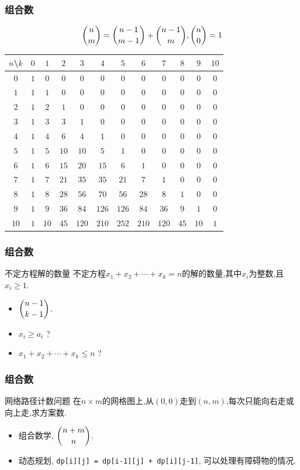\documentclass{beamer}
\newcommand{\pau}{}
\begin{document}
\begin{frame}[fragile]
    \frametitle{组合数}
    $$\dbinom{n}{m}=\dbinom{n-1}{m-1}+\dbinom{n-1}{m},\dbinom{n}{0}=1$$
	\begin{center}
		\footnotesize
		\begin{tabular}{c|ccccccccccc}
			$n$\textbackslash$k$&$0$&$1$&$2$&$3$&$4$&$5$&$6$&$7$&$8$&$9$&$10$\\\hline
			$0$&$1$&$0$&$0$&$0$&$0$&$0$&$0$&$0$&$0$&$0$&$0$\\
			$1$&$1$&$1$&$0$&$0$&$0$&$0$&$0$&$0$&$0$&$0$&$0$\\
			$2$&$1$&$2$&$1$&$0$&$0$&$0$&$0$&$0$&$0$&$0$&$0$\\
			$3$&$1$&$3$&$3$&$1$&$0$&$0$&$0$&$0$&$0$&$0$&$0$\\
			$4$&$1$&$4$&$6$&$4$&$1$&$0$&$0$&$0$&$0$&$0$&$0$\\
			$5$&$1$&$5$&$10$&$10$&$5$&$1$&$0$&$0$&$0$&$0$&$0$\\
			$6$&$1$&$6$&$15$&$20$&$15$&$6$&$1$&$0$&$0$&$0$&$0$\\
			$7$&$1$&$7$&$21$&$35$&$35$&$21$&$7$&$1$&$0$&$0$&$0$\\
			$8$&$1$&$8$&$28$&$56$&$70$&$56$&$28$&$8$&$1$&$0$&$0$\\
			$9$&$1$&$9$&$36$&$84$&$126$&$126$&$84$&$36$&$9$&$1$&$0$\\
			$10$&$1$&$10$&$45$&$120$&$210$&$252$&$210$&$120$&$45$&$10$&$1$\\
		\end{tabular}
	\end{center}
\end{frame}

\begin{frame}[fragile]
    \frametitle{组合数}
    \begin{exampleblock}{不定方程解的数量}
        不定方程$x_1+x_2+\cdots+x_k=n$的解的数量,其中$x_i$为整数,且$x_i\geqslant1$.
    \end{exampleblock}\pau
    \begin{itemize}
        \item $\dbinom{n-1}{k-1}$. \pau
        \item $x_i\geqslant a_i$ ? \pau
        \item $x_1+x_2+\cdots+x_k\leqslant n$ ? 
    \end{itemize}
\end{frame}

\begin{frame}[fragile]
    \frametitle{组合数}
    \begin{exampleblock}{网络路径计数问题}
        在$n\times m$的网格图上,从$(0,0)$走到$(n,m)$,每次只能向右走或向上走,求方案数.
    \end{exampleblock}\pau
    \begin{itemize}
        \item 组合数学, $\dbinom{n+m}{n}$. \pau
        \item 动态规划, \texttt{dp[i][j] = dp[i-1][j] + dp[i][j-1]}, 可以处理有障碍物的情况.
    \end{itemize}
\end{frame}
\end{document}
